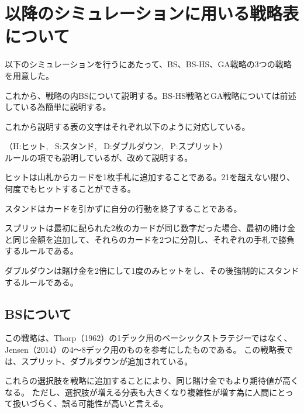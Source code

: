 \section{以降のシミュレーションに用いる戦略表について}
以下のシミュレーションを行うにあたって、BS、BS-HS、GA戦略の3つの戦略を用意した。

これから、戦略の内BSについて説明する。BS-HS戦略とGA戦略については前述している為簡単に説明する。

これから説明する表の文字はそれぞれ以下のように対応している。

（H:ヒット, \ S:スタンド, \ D:ダブルダウン, \ P:スプリット）  
\\

ルールの項でも説明しているが、改めて説明する。

ヒットは山札からカードを1枚手札に追加することである。21を超えない限り、何度でもヒットすることができる。

スタンドはカードを引かずに自分の行動を終了することである。

スプリットは最初に配られた2枚のカードが同じ数字だった場合、最初の賭け金と同じ金額を追加して、それらのカードを2つに分割し、それぞれの手札で勝負するルールである。

ダブルダウンは賭け金を2倍にして1度のみヒットをし、その後強制的にスタンドするルールである。



\subsection{BSについて}
この戦略は、Thorp（1962）の1デック用のベーシックストラテジーではなく、Jensen（2014）の4～8デック用のものを参考にしたものである。
この戦略表では、スプリット、ダブルダウンが追加されている。

これらの選択肢を戦略に追加することにより、同じ賭け金でもより期待値が高くなる。
ただし、選択肢が増える分表も大きくなり複雑性が増す為に人間にとって扱いづらく、誤る可能性が高いと言える。

